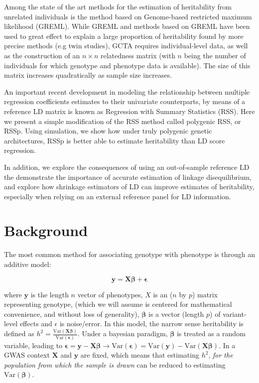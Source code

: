Among the state of the art methods for the estimation of heritability from unrelated individuals is the method based on Genome-based restricted maximum likelihood (GREML)\cite{GCTA}.  While GREML and methods based on GREML have been used to great effect to explain a large proportion of heritability found by more precise methods (e.g twin studies)\cite{GCTA}, GCTA requires individual-level data, as well as the construction of an $n \times n$ relatedness matrix (with $n$ being the number of individuals for which genotype and phenotype data is available).  The size of this matrix increases quadratically as sample size increases.

An important recent development in modeling the relationship between multiple regression coefficients estimates to their univariate counterparts, by means of a reference LD matrix is known as Regression with Summary Statistics (RSS)\cite{Zhu_2017}.  Here we present a simple modification of the RSS method called polygenic RSS, or RSSp.  Using simulation, we show how under truly polygenic genetic architectures, RSSp is better able to estimate heritability than LD score regression.

In addition, we explore the consequences of using an out-of-sample reference LD the demonstrate the importance of accurate estimation of linkage disequilibrium, and explore how shrinkage estimators of LD can improve estimates of heritability, especially when relying on an external reference panel for LD information.  

\section{Background}

The most common method for associating genotype with phenotype is through  an additive model:

$$ \textbf{y}= \textbf{X} \boldsymbol{\beta} + \boldsymbol{\epsilon}$$

where $\textbf{y}$ is the length $n$ vector of phenotypes, \(X\) is an (\(n\) by \(p\)) matrix representing genotype, (which we will assume is centered for mathematical convenience, and without loss of generality), \(\boldsymbol{\beta}\) is a vector (length \(p\)) of variant-level effects and \(\epsilon\) is noise/error. In this model, the narrow sense heritability is defined as $h^2=\frac{\text{Var}(\textbf{X}\boldsymbol{\beta})}{\text{Var}(\boldsymbol{\epsilon})}$. Under a bayesian paradigm, $\boldsymbol{\beta}$ is treated as a random variable, leading to  $\boldsymbol{\epsilon} = \textbf{y}-\textbf{X}\boldsymbol{\beta} \rightarrow \text{Var}(\boldsymbol{\epsilon})= \text{Var}(\textbf{y})-\text{Var}(\textbf{X}\boldsymbol{\beta})$.  In a GWAS context $\textbf{X}$ and $\textbf{y}$ are fixed, which means that estimating $h^2$, \emph{for the population from which the sample is drawn} can be reduced to estimating $\text{Var}(\boldsymbol{\beta})$.


